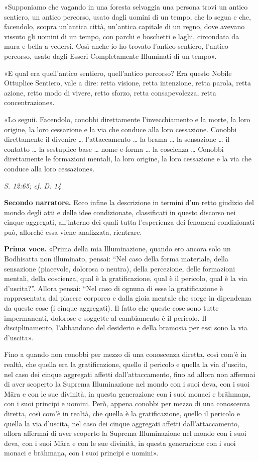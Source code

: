 «Supponiamo che vagando in una foresta selvaggia una persona trovi un
antico sentiero, un antico percorso, usato dagli uomini di un tempo, che
lo segua e che, facendolo, scopra un’antica città, un’antica capitale di
un regno, dove avevano vissuto gli uomini di un tempo, con parchi e
boschetti e laghi, circondata da mura e bella a vedersi. Così anche io
ho trovato l’antico sentiero, l’antico percorso, usato dagli Esseri
Completamente Illuminati di un tempo».


«E qual era quell’antico sentiero, quell’antico percorso? Era questo
Nobile Ottuplice Sentiero, vale a dire: retta visione, retta intenzione,
retta parola, retta azione, retto modo di vivere, retto sforzo, retta
consapevolezza, retta concentrazione».


«Lo seguii. Facendolo, conobbi direttamente l’invecchiamento e la morte,
la loro origine, la loro cessazione e la via che conduce alla loro
cessazione. Conobbi direttamente il divenire …​ l’attaccamento …​ la
brama …​ la sensazione …​ il contatto …​ la sestuplice base …​
nome-e-forma …​ la coscienza …​ Conobbi direttamente le formazioni
mentali, la loro origine, la loro cessazione e la via che conduce alla
loro cessazione».


\emph{S. 12:65; cf. D. 14}


\textbf{Secondo narratore.} Ecco infine la descrizione in termini d’un retto
giudizio del mondo degli atti e delle idee condizionate, classificati in
questo discorso nei cinque aggregati, all’interno dei quali tutta
l’esperienza dei fenomeni condizionati può, allorché essa viene
analizzata, rientrare.


\textbf{Prima voce.} «Prima della mia Illuminazione, quando ero ancora solo un
Bodhisatta non illuminato, pensai: “Nel caso della forma materiale,
della sensazione (piacevole, dolorosa o neutra), della percezione, delle
formazioni mentali, della coscienza, qual è la gratificazione, qual è il
pericolo, qual è la via d’uscita?”. Allora pensai: “Nel caso di ognuna
di esse la gratificazione è rappresentata dal piacere corporeo e dalla
gioia mentale che sorge in dipendenza da queste cose (i cinque
aggregati). Il fatto che queste cose sono tutte impermanenti, dolorose e
soggette al cambiamento è il pericolo. Il disciplinamento, l’abbandono
del desiderio e della bramosia per essi sono la via d’uscita».


Fino a quando non conobbi per mezzo di una conoscenza diretta, così
com’è in realtà, che quella era la gratificazione, quello il pericolo e
quella la via d’uscita, nel caso dei cinque aggregati affetti
dall’attaccamento, fino ad allora non affermai di aver scoperto la
Suprema Illuminazione nel mondo con i suoi deva, con i suoi Māra e con
le sue divinità, in questa generazione con i suoi monaci e brāhmaṇa, con
i suoi principi e uomini. Però, appena conobbi per mezzo di una
conoscenza diretta, così com’è in realtà, che quella è la
gratificazione, quello il pericolo e quella la via d’uscita, nel caso
dei cinque aggregati affetti dall’attaccamento, allora affermai di aver
scoperto la Suprema Illuminazione nel mondo con i suoi deva, con i suoi
Māra e con le sue divinità, in questa generazione con i suoi monaci e
brāhmaṇa, con i suoi principi e uomini».


